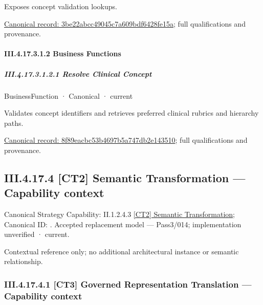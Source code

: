 Exposes concept validation lookups.


{\footnotesize \href{../../../../continuum/business/business-service/3be22abcc49045c7a609bdf6428fe15a.md}{Canonical record: 3be22abcc49045c7a609bdf6428fe15a}; full qualifications and provenance.}\par
\paragraph*{III.4.17.3.1.2 Business Functions}
\label{navigation:III.4.17.3.1.2}

\subparagraph*{III.4.17.3.1.2.1 Resolve Clinical Concept}
\label{navigation:III.4.17.3.1.2.1}

\label{element:8f89eacbc53b4697b5a747db2e143510}
{\small BusinessFunction · Canonical · current}\par

Validates concept identifiers and retrieves preferred clinical rubrics and hierarchy paths.


{\footnotesize \href{../../../../continuum/business/business-function/8f89eacbc53b4697b5a747db2e143510.md}{Canonical record: 8f89eacbc53b4697b5a747db2e143510}; full qualifications and provenance.}\par
\subsection*{III.4.17.4 [CT2] Semantic Transformation — Capability context}
\label{navigation:III.4.17.4}

{\small Canonical Strategy Capability: II.1.2.4.3 \hyperref[element:75c038039b55453184cbf1e787120136]{[CT2] Semantic Transformation}; Canonical ID: \texttt{}. Accepted replacement model — Pass3/014; implementation unverified · current.}\par
Contextual reference only; no additional architectural instance or semantic relationship.\par
\subsubsection*{III.4.17.4.1 [CT3] Governed Representation Translation — Capability context}
\label{navigation:III.4.17.4.1}

